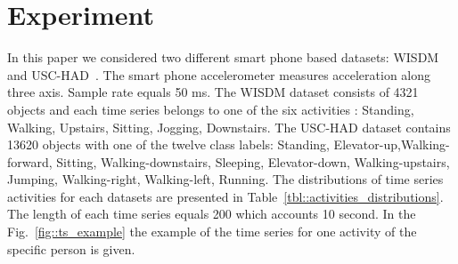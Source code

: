 \documentclass{llncs}
\begin{document}
\section{Experiment}
In this paper we considered two different smart phone based datasets: WISDM~\cite{wisdm} and USC-HAD~\cite{usc}. 
The smart phone accelerometer measures acceleration along three axis. 
Sample rate equals 50 ms. 
The WISDM dataset consists of 4321 objects and each time series belongs to one of the six activities : Standing, Walking, Upstairs, Sitting, Jogging, Downstairs. The USC-HAD dataset contains 13620 objects with one of the twelve class labels: Standing, Elevator-up,Walking-forward, Sitting, Walking-downstairs, Sleeping, Elevator-down, Walking-upstairs, Jumping, Walking-right, Walking-left, Running.
The distributions of time series activities for each datasets are presented in Table~\ref{tbl::activities_distributions}. 
The length of each time series equals 200 which accounts 10 second. 
In the Fig.~\ref{fig::ts_example} the example of the time series for one activity of the specific person is given.
\end{document}
